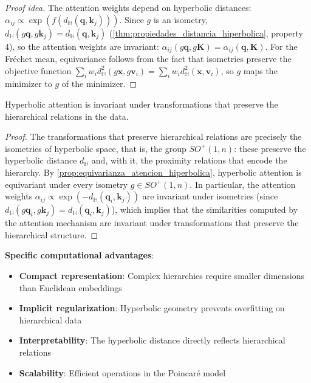 \begin{proof}[Proof idea]
The attention weights depend on hyperbolic distances: $\alpha_{ij} \propto \exp(f(d_{\mathbb{H}}(\mathbf{q}, \mathbf{k}_j)))$. Since $g$ is an isometry, $d_{\mathbb{H}}(g\mathbf{q}, g\mathbf{k}_j) = d_{\mathbb{H}}(\mathbf{q}, \mathbf{k}_j)$ (\autoref{thm:propiedades_distancia_hiperbolica}, property 4), so the attention weights are invariant: $\alpha_{ij}(g\mathbf{q}, g\mathbf{K}) = \alpha_{ij}(\mathbf{q}, \mathbf{K})$. For the Fréchet mean, equivariance follows from the fact that isometries preserve the objective function $\sum_i w_i d_{\mathbb{H}}^2(g\mathbf{x}, g\mathbf{v}_i) = \sum_i w_i d_{\mathbb{H}}^2(\mathbf{x}, \mathbf{v}_i)$, so $g$ maps the minimizer to $g$ of the minimizer.
\end{proof}

\begin{corollary}\label{cor:invarianza_similaridad}
Hyperbolic attention is invariant under transformations that preserve the hierarchical relations in the data.
\end{corollary}

\begin{proof}
The transformations that preserve hierarchical relations are precisely the isometries of hyperbolic space, that is, the group $SO^+(1,n)$: these preserve the hyperbolic distance $d_{\mathbb{H}}$ and, with it, the proximity relations that encode the hierarchy. By \autoref{prop:equivarianza_atencion_hiperbolica}, hyperbolic attention is equivariant under every isometry $g \in SO^+(1,n)$. In particular, the attention weights $\alpha_{ij} \propto \exp(-d_{\mathbb{H}}(\mathbf{q}_i, \mathbf{k}_j))$ are invariant under isometries (since $d_{\mathbb{H}}(g\mathbf{q}_i, g\mathbf{k}_j) = d_{\mathbb{H}}(\mathbf{q}_i, \mathbf{k}_j)$), which implies that the similarities computed by the attention mechanism are invariant under transformations that preserve the hierarchical structure.
\end{proof}

\textbf{Specific computational advantages}:

\begin{itemize}
    \item \textbf{Compact representation}: Complex hierarchies require smaller dimensions than Euclidean embeddings
    \item \textbf{Implicit regularization}: Hyperbolic geometry prevents overfitting on hierarchical data
    \item \textbf{Interpretability}: The hyperbolic distance directly reflects hierarchical relations
    \item \textbf{Scalability}: Efficient operations in the Poincaré model
\end{itemize}

